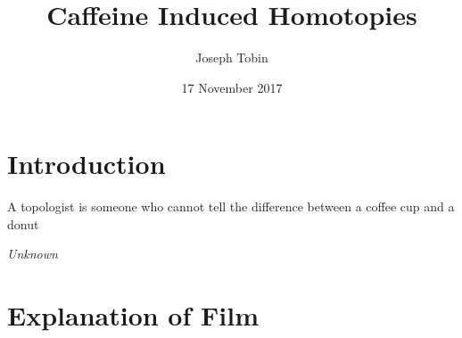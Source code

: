 \documentclass{article}
\title{Caffeine Induced Homotopies}
\author{Joseph Tobin}
\date{17 November 2017}
\begin{document}
\maketitle



\section{Introduction}
\epigraph{A topologist is someone who cannot tell the difference between a coffee cup and a donut}{\textit{Unknown}}



\section{Explanation of Film}


 
\end{document}
